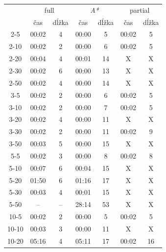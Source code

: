 \documentclass[
  printed, %
  oneside, %
  notable,   %
  nolof,     %
  nolot,     %
]{fithesis3}
\begin{document}
\begin{table}[hp!]
\centering
\begin{tabular}{c|cc|cc|cc}
\multirow{2}{*}{} & \multicolumn{2}{c|}{full} & \multicolumn{2}{c|}{\textit{A*}} & \multicolumn{2}{c}{partial} \\
 & čas & dĺžka & čas & dĺžka & čas & dĺžka \\ \hline
2-5  & 00:02 & \cellcolor{table-green}4  & 00:00 & 5  & \cellcolor{table-green}00:02 & 5 \\
2-10  & 00:02 & \cellcolor{table-green}2  & 00:00 & 6  & \cellcolor{table-green}00:02 & 5 \\
2-20  & \cellcolor{table-green}00:04 & \cellcolor{table-green}4  & 00:01 & 14  & X & X \\
2-30  & \cellcolor{table-green}00:02 & \cellcolor{table-green}6  & 00:00 & 13  & X & X \\
2-50  & \cellcolor{table-green}00:02 & \cellcolor{table-green}4  & 00:00 & 14  & X & X \\ \hline
3-5  & 00:02 & \cellcolor{table-green}2  & 00:00 & 6  & \cellcolor{table-green}00:02 & 5 \\
3-10  & 00:02 & \cellcolor{table-green}2  & 00:00 & 7  & \cellcolor{table-green}00:02 & 5 \\
3-20  & \cellcolor{table-green}00:02 & \cellcolor{table-green}4  & 00:00 & 11  & X & X \\
3-30  & 00:02 & \cellcolor{table-green}2  & 00:00 & 11  & \cellcolor{table-green}00:02 & 9 \\
3-50  & \cellcolor{table-green}00:03 & \cellcolor{table-green}5  & 00:00 & 15  & X & X \\ \hline
5-5  & 00:02 & \cellcolor{table-green}3  & 00:00 & 8  & \cellcolor{table-green}00:02 & 8 \\
5-10  & \cellcolor{table-green}00:07 & \cellcolor{table-green}6  & 00:04 & 15  & X & X \\
5-20  & \cellcolor{table-green}01:50 & \cellcolor{table-green}6 & 01:16 & 17  & X & X \\
5-30  & \cellcolor{table-green}00:03 & \cellcolor{table-green}4  & 00:01 & 15  & X & X \\
5-50  & -- & --  & 28:14 & 53  & X & X \\ \hline
10-5  & 00:02 & \cellcolor{table-green}2  & 00:00 & 5  & \cellcolor{table-green}00:02 & 5 \\
10-10  & \cellcolor{table-green}00:03 & \cellcolor{table-green}3  & 00:00 & 11  & X & X \\
10-20  & 05:16 & \cellcolor{table-green}4  & 05:11 & 17  & \cellcolor{table-green}00:02 & 16 \\

\end{tabular}
\end{table}
\end{document}
